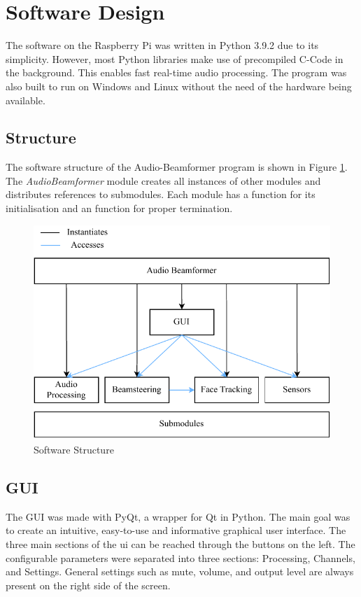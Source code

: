 \newpage
\section{Software Design}
The software on the Raspberry Pi was written in Python 3.9.2 due to its simplicity. However, most Python libraries make use of precompiled C-Code in the background. This enables fast real-time audio processing.
The program was also built to run on Windows and Linux without the need of the hardware being available.

\subsection{Structure}
The software structure of the Audio-Beamformer program is shown in Figure \ref{4_fig:software_structure}. The \textit{AudioBeamformer} module creates all instances of other modules and distributes references to submodules. Each module has a  function for its initialisation and an  function for proper termination. 
\begin{figure}[h!]
    \centering
    \includegraphics[width=\textwidth]{images/4_Design/Software/Software_Structure.pdf}
    \caption{Software Structure}
    \label{4_fig:software_structure}
\end{figure}
\newpage

\subsection{GUI}
The GUI was made with PyQt, a wrapper for Qt in Python. The main goal was to create an intuitive, easy-to-use and informative graphical user interface. 
The three main sections of the \acrshort{ui} can be reached through the buttons on the left. The configurable parameters were separated into three sections: Processing, Channels, and Settings. General settings such as mute, volume, and output level are always present on the right side of the screen.

